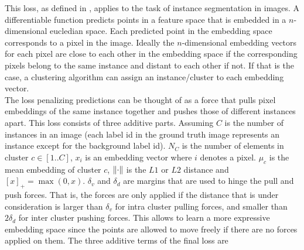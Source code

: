 This loss, as defined in \cite{brab2017semantic}, applies to the task of instance segmentation in images. A differentiable function predicts points in a feature space that is embedded in a $n$-dimensional eucledian space. Each predicted point in the embedding space corresponds to a pixel in the image. Ideally the $n$-dimensional embedding vectors for each pixel are close to each other in the embedding space if the corresponding pixels belong to the same instance and distant to each other if not. If that is the case, a clustering algorithm can assign an instance/cluster to each embedding vector.\\
The loss penalizing predictions can be thought of as a force that pulls pixel embeddings of the same instance together and pushes those of different instances apart.
This loss consists of three additive parts. Assuming $C$ is the number of instances in an image (each label id in the ground truth image represents an instance except for the background label id). $N_C$ is the number of elements in cluster $c \in [1..C]$, $x_i$ is an embedding vector where $i$ denotes a pixel. $\mu_c$ is the mean embedding of cluster $c$, $\left\lVert\cdot\right\rVert$ is the $L1$ or $L2$ distance and $[x]_+ = \max(0, x)$. $\delta_v$ and $\delta_d$ are margins that are used to hinge the pull and push forces. That is, the forces are only applied if the distance that is under consideration is larger than $\delta_v$ for intra cluster pulling forces, and smaller than $2\delta_d$ for inter cluster pushing forces. This allows to learn a more expressive embedding space since the points are allowed to move freely if there are no forces applied on them. The three additive terms of the final loss are\\

